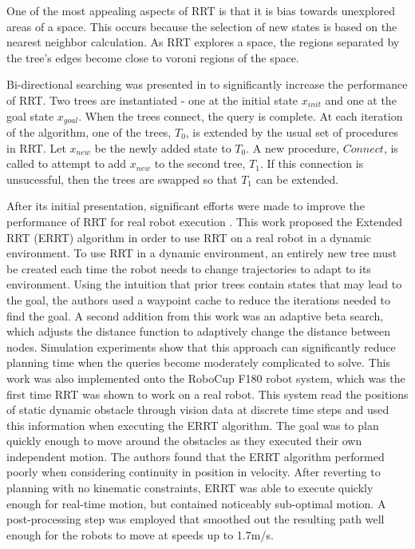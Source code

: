 \documentclass[10pt,conference]{ieeeconf}
\begin{document}
One of the most appealing aspects of RRT is that it is bias towards unexplored areas of a space. This occurs because the selection of new states is based on the nearest neighbor calculation. As RRT explores a space, the regions separated by the tree's edges become close to voroni regions of the space.

Bi-directional searching was presented in \cite{rrt2000kuffer} to significantly increase the performance of RRT. Two trees are instantiated - one at the initial state $x_{init}$ and one at the goal state $x_{goal}$. When the trees connect, the query is complete. At each iteration of the algorithm, one of the trees, $T_0$, is extended by the usual set of procedures in RRT. Let $x_{new}$ be the newly added state to $T_0$. A new procedure, $Connect$, is called to attempt to add $x_{new}$ to the second tree, $T_1$. If this connection is unsucessful, then the trees are swapped so that $T_1$ can be extended.

After its initial presentation, significant efforts were made to improve the performance of RRT for real robot execution \cite{bruce2002real}. This work proposed the Extended RRT (ERRT) algorithm in order to use RRT on a real robot in a dynamic environment. To use RRT in a dynamic environment, an entirely new tree must be created each time the robot needs to change trajectories to adapt to its environment. Using the intuition that prior trees contain states that may lead to the goal, the authors used a waypoint cache to reduce the iterations needed to find the goal. A second addition from this work was an adaptive beta search, which adjusts the distance function to adaptively change the distance between nodes. Simulation experiments show that this approach can significantly reduce planning time when the queries become moderately complicated to solve. This work was also implemented onto the RoboCup F180 robot system, which was the first time RRT was shown to work on a real robot. This system read the positions of static dynamic obstacle through vision data at discrete time steps and used this information when executing the ERRT algorithm. The goal was to plan quickly enough to move around the obstacles as they executed their own independent motion. The authors found that the ERRT algorithm performed poorly when considering continuity in position in velocity. After reverting to planning with no kinematic constraints, ERRT was able to execute quickly enough for real-time motion, but contained noticeably sub-optimal motion. A post-processing step was employed that smoothed out the resulting path well enough for the robots to move at speeds up to 1.7m/s.
\end{document}

